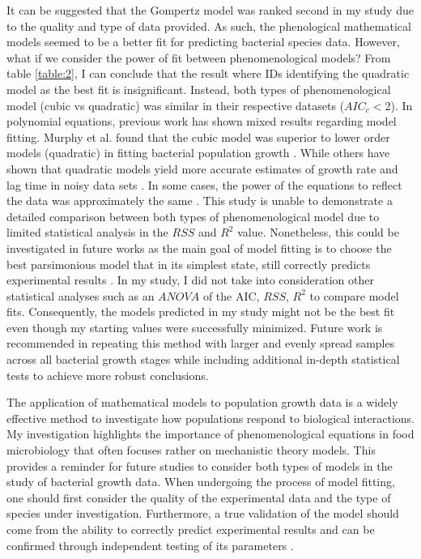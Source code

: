 \documentclass[11pt]{article}
\begin{document}
It can be suggested that the Gompertz model was ranked second in my study due to the quality and type of data provided. As such, the phenological
mathematical models seemed to be a better fit for predicting bacterial species data. However, what if we consider the power of fit between
phenomenological models? From table \ref{table:2}, I can conclude that the result where IDs identifying the quadratic model as the best fit is insignificant.
Instead, both types of phenomenological model (cubic vs quadratic) was similar in their respective datasets ($AIC_{c}<$2). In polynomial equations, previous work has shown mixed 
results regarding model fitting. Murphy et al. found that the cubic model was superior to lower order models (quadratic) in fitting bacterial population 
growth \cite{murphy_development_1996}. While others have shown that quadratic models yield more accurate estimates of growth rate and lag time in noisy data sets \cite{ng_mathematical_1997,gauch_prediction_1993,mcclure_predictive_1997}.
In some cases, the power of the equations to reflect the data was approximately the same \cite{gibson_predicting_1988}. This study is unable to demonstrate a 
detailed comparison between both types of phenomenological model due to limited statistical analysis in the $RSS$ and $R^{2}$ value. 
Nonetheless, this could be investigated in future works as the main goal of model fitting is to choose the best parsimonious model that in its 
simplest state, still correctly predicts experimental results \cite{gauch_prediction_1993,gibson_predicting_1988}. In my study, I did not take into consideration other statistical analyses
such as an $ANOVA$ of the AIC, $RSS$, $R^{2}$ to compare model fits. Consequently, the models predicted in my study might not be the best fit even 
though my starting values were successfully minimized. Future work is recommended in repeating this method with larger and evenly spread 
samples across all bacterial growth stages while including additional in-depth statistical tests to achieve more robust conclusions.

The application of mathematical models to population growth data is a widely effective method to investigate how populations respond to 
biological interactions. My investigation highlights the importance of phenomenological equations in food microbiology that often focuses rather
on mechanistic theory models. This provides a reminder for future studies to consider both types of models in the study of bacterial growth data.
When undergoing the process of model fitting, one should first consider the quality of the experimental data and the type of species under
investigation. Furthermore, a true validation of the model should come from the ability to correctly predict experimental results and can be 
confirmed through independent testing of its parameters \cite{peleg_microbial_2011}.
\end{document}
